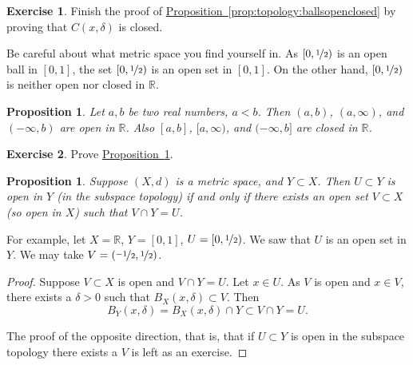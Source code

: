 \documentclass[12pt,openany]{book}
\newcommand{\R}{{\mathbb{R}}}
\theoremstyle{plain}
\newtheorem{prop}[thm]{Proposition}
\theoremstyle{remark}
\theoremstyle{definition}
\newenvironment{exbox}{%
    \def\FrameCommand{\vrule width 1pt \relax\hspace{10pt}}%
    \MakeFramed{\advance\hsize-\width\FrameRestore}%
}{%
    \endMakeFramed
}
\theoremstyle{exercise}
\newtheorem{exercise}{Exercise}[section]
\theoremstyle{example}
\newcommand{\propref}[1]{\hyperref[#1]{Proposition~\ref*{#1}}}
\begin{document}
\begin{exbox}
\begin{exercise}
Finish the proof of \propref{prop:topology:ballsopenclosed} by
proving that $C(x,\delta)$ is closed.
\end{exercise}
\end{exbox}

Be careful about what metric space you find yourself in.
As $[0,\nicefrac{1}{2})$ is
an open ball in $[0,1]$, the set $[0,\nicefrac{1}{2})$ is
an open set in $[0,1]$.  On the other hand, $[0,\nicefrac{1}{2})$
is neither open nor closed in $\R$.

\begin{prop} \label{prop:topology:intervals:openclosed}
Let $a,b$ be two real numbers, $a < b$.  Then $(a,b)$, $(a,\infty)$,
and $(-\infty,b)$ are open in $\R$.
Also $[a,b]$, $[a,\infty)$,
and $(-\infty,b]$ are closed in $\R$.
\end{prop}


\begin{exbox}
\begin{exercise}
Prove \propref{prop:topology:intervals:openclosed}.
\end{exercise}
\end{exbox}

\begin{prop} \label{prop:topology:subspaceopen}
Suppose $(X,d)$ is a metric space, and $Y \subset X$.  Then $U \subset Y$
is open in $Y$ (in the subspace topology) if and only if
there exists an open set $V \subset X$ (so open in $X$) such that
$V \cap Y = U$.
\end{prop}

For example, let $X = \R$, $Y=[0,1]$, $U = [0,\nicefrac{1}{2})$.
We saw that $U$ is an open set in $Y$.
We may take $V = (\nicefrac{-1}{2},\nicefrac{1}{2})$.

\begin{proof}
Suppose $V \subset X$ is open and
$V \cap Y = U$.
Let $x \in U$.
As $V$ is open and $x \in V$, there
exists a $\delta > 0$ such that $B_X(x,\delta) \subset V$.
Then
\begin{equation*}
B_Y(x,\delta) = B_X(x,\delta) \cap Y \subset V \cap Y = U .
\end{equation*}

The proof of the opposite direction, that is, that if $U \subset Y$
is open in the subspace topology there exists a $V$ is left as
an exercise.
\end{proof}
\end{document}
